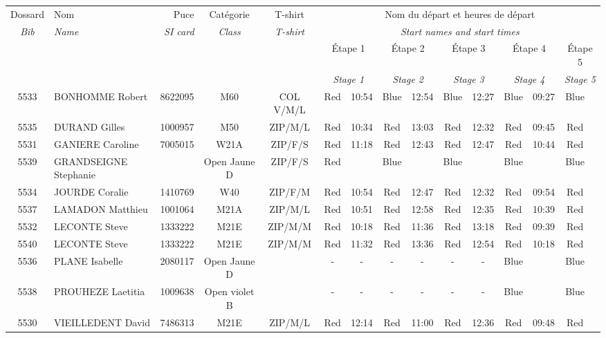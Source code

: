 \documentclass{report}
\begin{document}
  \begin{longtable}{|c|l|r|c|c|*{5}{cc|}}
    Dossard & Nom  & Puce    & Catégorie & T-shirt & \multicolumn{10}{c|}{Nom du départ et heures de départ} \\
    \itshape Bib     & \itshape Name & \itshape SI card & \itshape Class  & \itshape  T-shirt  & \multicolumn{10}{c|}{\itshape Start names and start times} \\
    \hline
    & & & & & \multicolumn{2}{c|}{Étape 1} & \multicolumn{2}{c|}{Étape 2} & \multicolumn{2}{c|}{Étape 3} & \multicolumn{2}{c|}{Étape 4} & \multicolumn{2}{c|}{Étape 5} \\
    & & & & & \multicolumn{2}{c|}{\itshape Stage 1} & \multicolumn{2}{c|}{\itshape Stage 2} & \multicolumn{2}{c|}{\itshape Stage 3} & \multicolumn{2}{c|}{\itshape Stage 4} & \multicolumn{2}{c|}{\itshape Stage 5} \\
    \hline
    5533 & BONHOMME Robert & 8622095 & M60 & COL V/M/L & Red & 10:54 & Blue & 12:54 & Blue & 12:27 & Blue & 09:27 & Blue &  \\
    5535 & DURAND Gilles & 1000957 & M50 & ZIP/M/L & Red & 10:34 & Red & 13:03 & Red & 12:32 & Red & 09:45 & Red &  \\
    5531 & GANIERE Caroline & 7005015 & W21A & ZIP/F/S & Red & 11:18 & Red & 12:43 & Red & 12:47 & Red & 10:44 & Red &  \\
    5539 & GRANDSEIGNE Stephanie &  & Open Jaune D & ZIP/F/S & Red &   & Blue &   & Blue &   & Blue &   & Blue &  \\
    5534 & JOURDE Coralie & 1410769 & W40 & ZIP/F/M & Red & 10:54 & Red & 12:47 & Red & 12:32 & Red & 09:54 & Red &  \\
    5537 & LAMADON Matthieu & 1001064 & M21A & ZIP/M/L & Red & 10:51 & Red & 12:58 & Red & 12:35 & Red & 10:39 & Red &  \\
    5532 & LECONTE Steve & 1333222 & M21E & ZIP/M/M & Red & 10:18 & Red & 11:36 & Red & 13:18 & Red & 09:39 & Red &  \\
    5540 & LECONTE Steve & 1333222 & M21E & ZIP/M/M & Red & 11:32 & Red & 13:36 & Red & 12:54 & Red & 10:18 & Red &  \\
    5536 & PLANE Isabelle & 2080117 & Open Jaune D &   & - &  - & - &  - & - &  - & Blue &   & Blue &  \\
    5538 & PROUHEZE Laetitia & 1009638 & Open violet B &   & - &  - & - &  - & - &  - & Blue &   & Blue &  \\
    5530 & VIEILLEDENT David & 7486313 & M21E & ZIP/M/L & Red & 12:14 & Red & 11:00 & Red & 12:36 & Red & 09:48 & Red &  \\
  \end{longtable}
\end{document}
